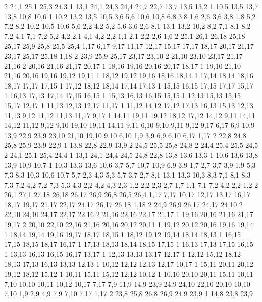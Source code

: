 2%
24,1
25,1
25,3
24,3
1%
13,1
24,1
24,3
24,4
24,7
22,7
13,7
13,5
13,2
1%
10,5
13,5
13,7
13,8
10,8
10,6
1%
10,2
13,2
13,5
10,5
%
3,6
5,6
10,6
10,8
6,8
3,8
%
1,6
2,6
3,6
3,8
1,8
%
5,2
7,2
8,2
10,2
10,5
10,6
5,6
%
2,2
4,2
5,2
5,6
3,6
2,6
%
8,1
13,1
13,2
10,2
8,2
%
7,1
8,1
8,2
7,2
%
4,1
7,1
7,2
5,2
4,2
%
2,1
4,1
4,2
2,2
%
1,1
2,1
2,2
2,6
1,6
2%
25,1
26,1
26,18
25,18
25,17
25,9
25,8
25,5
25,4
%
1,17
6,17
9,17
11,17
12,17
15,17
17,17
18,17
20,17
21,17
23,17
25,17
25,18
1,18
2%
23,9
25,9
25,17
23,17
23,10
2%
21,10
23,10
23,17
21,17
21,16
2%
20,16
21,16
21,17
20,17
1%
18,16
19,16
20,16
20,17
18,17
1%
19,10
21,10
21,16
20,16
19,16
19,12
19,11
1%
18,12
19,12
19,16
18,16
18,14
1%
17,14
18,14
18,16
18,17
17,17
17,15
1%
17,12
18,12
18,14
17,14
17,13
1%
15,15
16,15
17,15
17,17
15,17
1%
16,13
17,13
17,14
17,15
16,15
1%
15,13
16,13
16,15
15,15
1%
12,13
15,13
15,15
15,17
12,17
1%
11,13
12,13
12,17
11,17
1%
11,12
14,12
17,12
17,13
16,13
15,13
12,13
11,13
%
9,12
11,12
11,13
11,17
9,17
1%
14,11
19,11
19,12
18,12
17,12
14,12
%
9,11
14,11
14,12
11,12
9,12
%
9,10
19,10
19,11
14,11
9,11
%
6,10
9,10
9,11
9,12
9,17
6,17
%
6,9
10,9
13,9
22,9
23,9
23,10
21,10
19,10
9,10
6,10
%
1,9
3,9
6,9
6,10
6,17
1,17
2%
22,8
24,8
25,8
25,9
23,9
22,9
1%
13,8
22,8
22,9
13,9
2%
24,5
25,5
25,8
24,8
2%
24,4
25,4
25,5
24,5
2%
24,1
25,1
25,4
24,4
1%
13,1
24,1
24,4
24,5
24,8
22,8
13,8
13,6
13,3
1%
10,6
13,6
13,8
13,9
10,9
10,7
1%
10,3
13,3
13,6
10,6
%
3,7
5,7
10,7
10,9
6,9
3,9
%
1,7
2,7
3,7
3,9
1,9
%
5,3
7,3
8,3
10,3
10,6
10,7
5,7
%
2,3
4,3
5,3
5,7
3,7
2,7
%
8,1
13,1
13,3
10,3
8,3
%
7,1
8,1
8,3
7,3
7,2
%
4,2
7,2
7,3
5,3
4,3
%
2,2
4,2
4,3
2,3
%
1,2
2,2
2,3
2,7
1,7
%
1,1
7,1
7,2
4,2
2,2
1,2
2%
26,1
27,1
27,18
26,18
26,17
26,9
26,8
26,5
26,4
%
1,17
7,17
10,17
12,17
13,17
16,17
18,17
19,17
21,17
22,17
24,17
26,17
26,18
1,18
2%
24,9
26,9
26,17
24,17
24,10
2%
22,10
24,10
24,17
22,17
22,16
2%
21,16
22,16
22,17
21,17
1%
19,16
20,16
21,16
21,17
19,17
2%
20,10
22,10
22,16
21,16
20,16
20,12
20,11
1%
19,12
20,12
20,16
19,16
19,14
1%
18,14
19,14
19,16
19,17
18,17
18,15
1%
18,12
19,12
19,14
18,14
18,13
1%
16,15
17,15
18,15
18,17
16,17
1%
17,13
18,13
18,14
18,15
17,15
1%
16,13
17,13
17,15
16,15
1%
13,13
16,13
16,15
16,17
13,17
1%
12,13
13,13
13,17
12,17
1%
12,12
15,12
18,12
18,13
17,13
16,13
13,13
12,13
1%
10,12
12,12
12,13
12,17
10,17
1%
15,11
20,11
20,12
19,12
18,12
15,12
1%
10,11
15,11
15,12
12,12
10,12
1%
10,10
20,10
20,11
15,11
10,11
%
7,10
10,10
10,11
10,12
10,17
7,17
%
7,9
11,9
14,9
23,9
24,9
24,10
22,10
20,10
10,10
7,10
%
1,9
2,9
4,9
7,9
7,10
7,17
1,17
2%
23,8
25,8
26,8
26,9
24,9
23,9
1%
14,8
23,8
23,9
